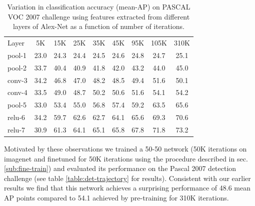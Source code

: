 \documentclass[runningheads]{llncs}
\begin{document}
\setlength{\tabcolsep}{4pt}
\begin{table}
\begin{center}
\caption{Variation in classification accuracy (mean-AP) on PASCAL VOC 2007 challenge using features extracted from different layers of Alex-Net as a function of number of iterations.}
\label{table:det-traj-classify}
\begin{tabular}{lcccccccc}
\hline\noalign{\smallskip}
Layer  & 5K & 15K & 25K & 35K & 45K & 95K & 105K & 310K \\
\noalign{\smallskip}
\hline
\noalign{\smallskip}
pool-1 & 23.0 & 24.3 & 24.4 & 24.5 & 24.6 & 24.8 & 24.7 & 25.1\\
pool-2 & 33.7 & 40.4 & 40.9 & 41.8 & 42.0 & 43.2 & 44.0 & 45.0\\
conv-3 & 34.2 & 46.8 & 47.0 & 48.2 & 48.5 & 49.4 & 51.6 & 50.1\\
conv-4 & 33.5 & 49.0 & 48.7 & 50.2 & 50.6 & 51.6 & 54.1 & 54.2\\
pool-5 & 33.0 & 53.4 & 55.0 & 56.8 & 57.4 & 59.2 & 63.5 & 65.6\\
relu-6 & 34.2 & 59.7 & 62.6 & 62.7 & 64.1 & 65.6 & 69.3 & 70.6\\
relu-7 & 30.9 & 61.3 & 64.1 & 65.1 & 65.8 & 67.8 & 71.8 & 73.2\\
\hline
\end{tabular}
\end{center}
\end{table}
\setlength{\tabcolsep}{1.4pt}

Motivated by these observations we trained a 50-50 network (50K iterations on imagenet and finetuned for 50K iterations using the procedure described in sec. \ref{sub:fine-train}) and evaluated its performance on the  Pascal 2007 detection challenge (see table \ref{table:det-trajectory} for results). Consistent with our earlier results we find that this network achieves a surprising performance of 48.6 mean AP points compared to 54.1 achieved by pre-training for 310K iterations. 
\end{document}
